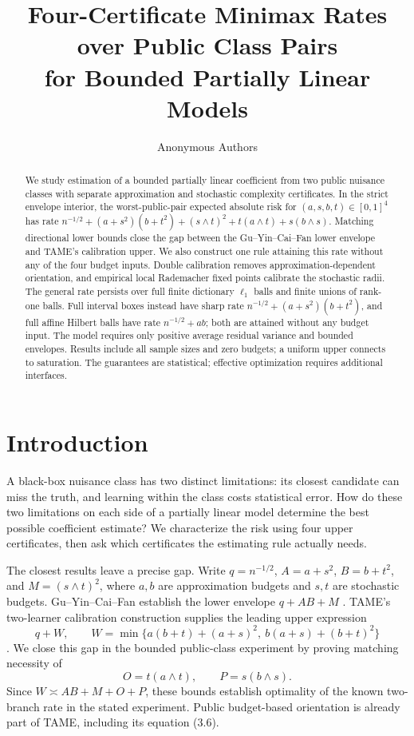 \documentclass{article}
\title{Four-Certificate Minimax Rates over Public Class Pairs\\for Bounded Partially Linear Models}
\author{Anonymous Authors}
\theoremstyle{definition}
\theoremstyle{remark}
\begin{document}
\maketitle

\begin{abstract}
We study estimation of a bounded partially linear coefficient from two public nuisance classes with separate approximation and stochastic complexity certificates. In the strict envelope interior, the worst-public-pair expected absolute risk for \((a,s,b,t)\in[0,1]^4\) has rate
\(n^{-1/2}+(a+s^2)(b+t^2)+(s\wedge t)^2+t(a\wedge t)+s(b\wedge s)\).
Matching directional lower bounds close the gap between the Gu--Yin--Cai--Fan lower envelope and TAME's calibration upper. We also construct one rule attaining this rate without any of the four budget inputs. Double calibration removes approximation-dependent orientation, and empirical local Rademacher fixed points calibrate the stochastic radii. The general rate persists over full finite dictionary \(\ell_1\) balls and finite unions of rank-one balls. Full interval boxes instead have sharp rate \(n^{-1/2}+(a+s^2)(b+t^2)\), and full affine Hilbert balls have rate \(n^{-1/2}+ab\); both are attained without any budget input. The model requires only positive average residual variance and bounded envelopes. Results include all sample sizes and zero budgets; a uniform upper connects to saturation. The guarantees are statistical; effective optimization requires additional interfaces.
\end{abstract}

\section{Introduction}
\label{sec:intro}
A black-box nuisance class has two distinct limitations: its closest candidate can miss the truth, and learning within the class costs statistical error. How do these two limitations on each side of a partially linear model determine the best possible coefficient estimate? We characterize the risk using four upper certificates, then ask which certificates the estimating rule actually needs.

The closest results leave a precise gap. Write \(q=n^{-1/2}\), \(A=a+s^2\), \(B=b+t^2\), and \(M=(s\wedge t)^2\), where \(a,b\) are approximation budgets and \(s,t\) are stochastic budgets. Gu--Yin--Cai--Fan establish the lower envelope \(q+AB+M\) \citep{gu2026tamingbiases}. TAME's two-learner calibration construction supplies the leading upper expression
\[
 q+W,\qquad W=\min\{a(b+t)+(a+s)^2,\ b(a+s)+(b+t)^2\}
\]
\citep{gu2026optimalblackbox}. We close this gap in the bounded public-class experiment by proving matching necessity of
\[
 O=t(a\wedge t),\qquad P=s(b\wedge s).
\]
Since \(W\asymp AB+M+O+P\), these bounds establish optimality of the known two-branch rate in the stated experiment. Public budget-based orientation is already part of TAME, including its equation (3.6).
\end{document}
